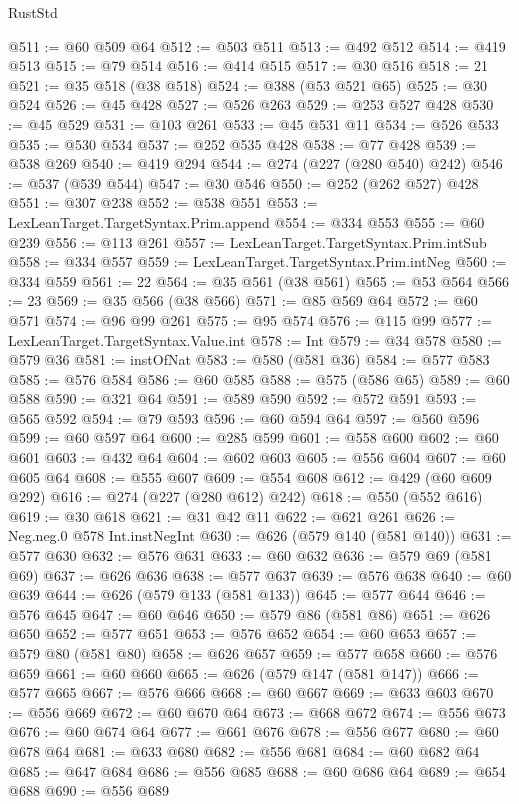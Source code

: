 \begin{lexlean}{RustStd}
\begin{coremodule}
@511 := @60 @509 @64
@512 := @503 @511
@513 := @492 @512
@514 := @419 @513
@515 := @79 @514
@516 := @414 @515
@517 := @30 @516
@518 := 21
@521 := @35 @518 (@38 @518)
@524 := @388 (@53 @521 @65)
@525 := @30 @524
@526 := @45 @428
@527 := @526 @263
@529 := @253 @527 @428
@530 := @45 @529
@531 := @103 @261
@533 := @45 @531 @11
@534 := @526 @533
@535 := @530 @534
@537 := @252 @535 @428
@538 := @77 @428
@539 := @538 @269
@540 := @419 @294
@544 := @274 (@227 (@280 @540) @242)
@546 := @537 (@539 @544)
@547 := @30 @546
@550 := @252 (@262 @527) @428
@551 := @307 @238
@552 := @538 @551
@553 := LexLeanTarget.TargetSyntax.Prim.append
@554 := @334 @553
@555 := @60 @239
@556 := @113 @261
@557 := LexLeanTarget.TargetSyntax.Prim.intSub
@558 := @334 @557
@559 := LexLeanTarget.TargetSyntax.Prim.intNeg
@560 := @334 @559
@561 := 22
@564 := @35 @561 (@38 @561)
@565 := @53 @564
@566 := 23
@569 := @35 @566 (@38 @566)
@571 := @85 @569 @64
@572 := @60 @571
@574 := @96 @99 @261
@575 := @95 @574
@576 := @115 @99
@577 := LexLeanTarget.TargetSyntax.Value.int
@578 := Int
@579 := @34 @578
@580 := @579 @36
@581 := instOfNat
@583 := @580 (@581 @36)
@584 := @577 @583
@585 := @576 @584
@586 := @60 @585
@588 := @575 (@586 @65)
@589 := @60 @588
@590 := @321 @64
@591 := @589 @590
@592 := @572 @591
@593 := @565 @592
@594 := @79 @593
@596 := @60 @594 @64
@597 := @560 @596
@599 := @60 @597 @64
@600 := @285 @599
@601 := @558 @600
@602 := @60 @601
@603 := @432 @64
@604 := @602 @603
@605 := @556 @604
@607 := @60 @605 @64
@608 := @555 @607
@609 := @554 @608
@612 := @429 (@60 @609 @292)
@616 := @274 (@227 (@280 @612) @242)
@618 := @550 (@552 @616)
@619 := @30 @618
@621 := @31 @42 @11
@622 := @621 @261
@626 := Neg.neg.{0} @578 Int.instNegInt
@630 := @626 (@579 @140 (@581 @140))
@631 := @577 @630
@632 := @576 @631
@633 := @60 @632
@636 := @579 @69 (@581 @69)
@637 := @626 @636
@638 := @577 @637
@639 := @576 @638
@640 := @60 @639
@644 := @626 (@579 @133 (@581 @133))
@645 := @577 @644
@646 := @576 @645
@647 := @60 @646
@650 := @579 @86 (@581 @86)
@651 := @626 @650
@652 := @577 @651
@653 := @576 @652
@654 := @60 @653
@657 := @579 @80 (@581 @80)
@658 := @626 @657
@659 := @577 @658
@660 := @576 @659
@661 := @60 @660
@665 := @626 (@579 @147 (@581 @147))
@666 := @577 @665
@667 := @576 @666
@668 := @60 @667
@669 := @633 @603
@670 := @556 @669
@672 := @60 @670 @64
@673 := @668 @672
@674 := @556 @673
@676 := @60 @674 @64
@677 := @661 @676
@678 := @556 @677
@680 := @60 @678 @64
@681 := @633 @680
@682 := @556 @681
@684 := @60 @682 @64
@685 := @647 @684
@686 := @556 @685
@688 := @60 @686 @64
@689 := @654 @688
@690 := @556 @689

\end{coremodule}
\end{lexlean}
